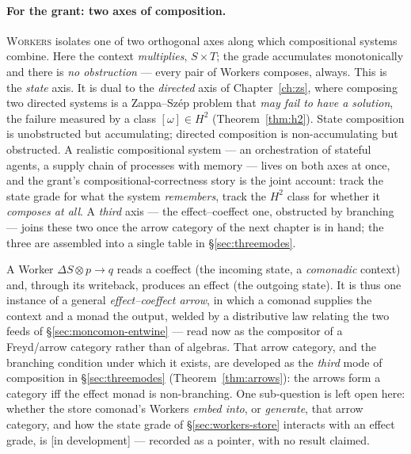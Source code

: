 \documentclass[11pt,a4paper]{book}
\newcommand{\Workers}{\textup{\textsc{Workers}}}
\theoremstyle{plain}
\theoremstyle{definition}
\theoremstyle{remark}
\begin{document}
\paragraph{For the grant: two axes of composition.} \Workers{} isolates one of two orthogonal axes
along which compositional systems combine. Here the context \emph{multiplies}, $S\times T$; the grade
accumulates monotonically and there is \emph{no obstruction} --- every pair of Workers composes, always. This
is the \emph{state} axis. It is dual to the \emph{directed} axis of Chapter~\ref{ch:zs}, where composing two
directed systems is a Zappa--Sz\'ep problem that \emph{may fail to have a solution}, the failure measured by
a class $[\omega]\in H^{2}$ (Theorem~\ref{thm:h2}). State composition is unobstructed but accumulating;
directed composition is non-accumulating but obstructed. A realistic compositional system --- an
orchestration of stateful agents, a supply chain of processes with memory --- lives on both axes at once, and
the grant's compositional-correctness story is the joint account: track the state grade for what the system
\emph{remembers}, track the $H^{2}$ class for whether it \emph{composes at all}. A \emph{third} axis --- the
effect--coeffect one, obstructed by branching --- joins these two once the arrow category of the next chapter
is in hand; the three are assembled into a single table in \S\ref{sec:threemodes}.

\begin{teachbox}
A Worker $\Delta S\otimes p\to q$ reads a coeffect (the incoming state, a \emph{comonadic} context) and,
through its writeback, produces an effect (the outgoing state). It is thus one instance of a general
\emph{effect--coeffect arrow}, in which a comonad supplies the context and a monad the output, welded by a
distributive law relating the two feeds of \S\ref{sec:moncomon-entwine} --- read now as the compositor of a
Freyd/arrow category rather than of algebras. That arrow category, and the branching condition under which
it exists, are developed as the \emph{third} mode of composition in \S\ref{sec:threemodes}
(Theorem~\ref{thm:arrows}): the arrows form a category iff the effect monad is non-branching. One
sub-question is left open here: whether the store comonad's Workers \emph{embed into}, or \emph{generate},
that arrow category, and how the state grade of \S\ref{sec:workers-store} interacts with an effect grade,
is \textsf{[in development]} --- recorded as a pointer, with no result claimed.
\end{teachbox}
\end{document}
